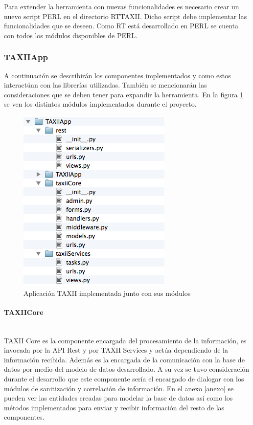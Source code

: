 Para extender la herramienta con nuevas funcionalidades es necesario crear un nuevo script PERL en el directorio RTTAXII. Dicho script debe implementar las funcionalidades que se deseen. Como RT está desarrollado en PERL se cuenta con todos los módulos disponibles de PERL.

\subsubsection{TAXIIApp}
A continuación se describirán los componentes implementados y como estos interactúan con las librerías utilizadas.
También se mencionarán las consideraciones que se deben tener para expandir la herramienta.
En la figura \ref{fig.taxii_app} se ven los distintos módulos implementados durante el proyecto. 

\begin{figure}
	\centering
	\includegraphics{imagenes/TAXIIApp.png}
	\caption{Aplicación TAXII implementada junto con sus módulos}
	\label{fig.taxii_app}
\end{figure}

\paragraph{TAXIICore}\ \\
TAXII Core es la componente encargada del procesamiento de la información, es invocada por la API Rest y por TAXII Services y actúa dependiendo de la información recibida. Además es la encargada de la comunicación con la base de datos por medio del modelo de datos desarrollado. A su vez se tuvo consideración durante el desarrollo que este componente sería el encargado de dialogar con los módulos de sanitización y correlación de información. 
En el anexo \ref{anexo} se pueden ver las entidades creadas para modelar la base de datos así como los métodos implementados para enviar y recibir información del resto de las componentes.

